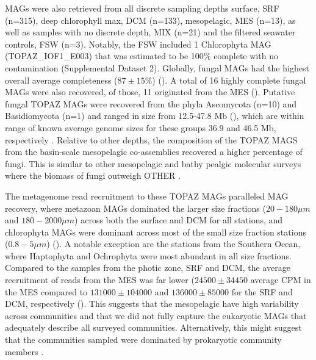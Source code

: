 \documentclass[12pt]{article}
\numberwithin{equation}{section}
\begin{document}
MAGs were also retrieved from all discrete sampling depths surface, SRF (n=315), deep chlorophyll max, DCM (n=133), mesopelagic, MES (n=13), as well as samples with no discrete depth, MIX (n=21) and the filtered seawater controls, FSW (n=3). Notably, the FSW included 1 Chlorophyta MAG (TOPAZ\_IOF1\_E003) that was estimated to be 100\% complete with no contamination (Supplemental Dataset 2). Globally, fungal MAGs had the highest overall average completeness ($87 \pm 15\%$) ().  A total of 16 highly complete fungal MAGs were also recovered, of those, 11 originated from the MES (). Putative fungal TOPAZ MAGs were recovered from the phyla Ascomycota (n=10) and Basidiomycota (n=1) and ranged in size from 12.5-47.8 Mb (), which are within range of known average genome sizes for these groups 36.9 and 46.5 Mb, respectively \citep{Mohanta_2015}. 
Relative to other depths, the composition of the TOPAZ MAGS from the basin-scale mesopelagic co-assemblies recovered a higher percentage of fungi. This is similar to other mesopelagic and bathy pealgic molecular surveys where the biomass of fungi outweigh OTHER \citep{Morales_2019,Pernice_2015,Edgcomb_2010}.



The metagenome read recruitment to these TOPAZ MAGs paralleled MAG recovery, where metazoan MAGs dominated the larger size fractions ($20-180 \mu m$ and $180-2000 \mu m$) across both the surface and DCM for all stations, and chlorophyta MAGs were dominant across most of the small size fraction stations ($0.8-5 \mu m$) (). A notable exception are the stations from the Southern Ocean, where Haptophyta and Ochrophyta were most abundant in all size fractions. Compared to the samples from the photic zone, SRF and DCM, the average recruitment of reads from the MES was far lower ($24500 \pm 34450$ average CPM in the MES compared to $131000 \pm 104000 $ and $136000 \pm 85000$ for the SRF and DCM, respectively (). This suggests that the mesopelagic have high variability across communities \citep{Pernice_2015} and that we did not fully capture the eukaryotic MAGs that adequately describe all surveyed communities. Alternatively, this might suggest that the communities sampled were dominated by prokaryotic community members \citep{Pernice_2014}.  
\end{document}
